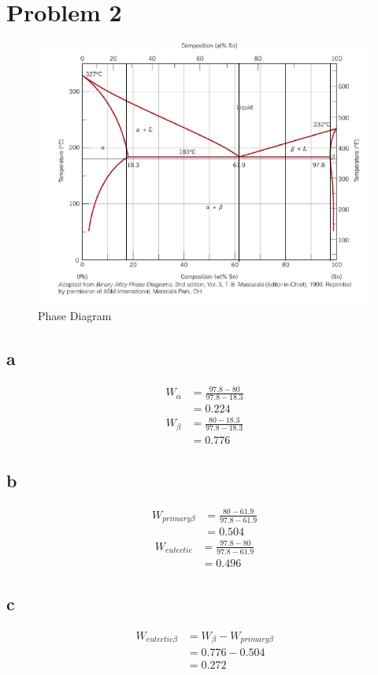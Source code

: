 \documentclass[a4paper]{oblivoir}
\begin{document}
\section{Problem 2}
\begin{figure}[htbp]
	\begin{centering}
	\includegraphics[width = 0.75\linewidth]{pro2.png}%
	\caption{\label{fig:pro2}  Phase Diagram}
	\end{centering}
\end{figure}

\subsection{a}
\begin{align}
	W_{\alpha} &= \frac{97.8-80}{97.8-18.3}\\
	&= 0.224
\end{align}
\begin{align}
	W_{\beta} &= \frac{80-18.3}{97.8-18.3}\\
	&= 0.776
\end{align}

\subsection{b}
\begin{align}
	W_{primary \beta} &= \frac{80-61.9}{97.8-61.9}\\
	&= 0.504
\end{align}
\begin{align}
	W_{eutectic} &= \frac{97.8- 80}{97.8-61.9}\\
	&= 0.496
\end{align}

\subsection{c}
\begin{align}
	W_{eutectic\beta} &= W_{\beta} - W_{primary \beta}\\
	&= 0.776-0.504\\
	&= 0.272
\end{align}
\end{document}
